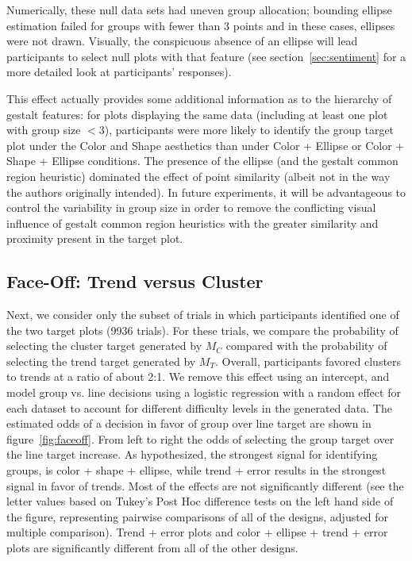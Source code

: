 \documentclass[11pt]{isuthesis}\usepackage[]{graphicx}\usepackage[]{color}
\begin{document}
Numerically, these null data sets had uneven group allocation; bounding ellipse estimation failed for groups with fewer than 3 points and in these cases, ellipses were not drawn. Visually, the conspicuous absence of an ellipse will lead participants to select null plots with that feature (see section~\ref{sec:sentiment} for a more detailed look at participants' responses).

This effect actually provides some additional information as to the hierarchy of gestalt features: for plots displaying the same data (including at least one plot with group size $<3$), participants were more likely to identify the group target plot under the Color and Shape aesthetics than under Color + Ellipse or Color + Shape + Ellipse conditions. 
The presence of the ellipse (and the gestalt common region heuristic) dominated the effect of point similarity (albeit not in the way the authors originally intended). 
In future experiments, it will be advantageous to control the variability in group size in order to remove the conflicting visual influence of gestalt common region heuristics with the greater similarity and proximity present in the target plot. 

\subsection{Face-Off: Trend versus Cluster}
Next, we consider only the subset of trials in which participants identified one of the two target plots (9936 trials). For these trials, we compare the probability of selecting the cluster target generated by $M_C$ compared with the probability of selecting the trend target generated by $M_T$. Overall, participants favored clusters to trends at a ratio of about 2:1. We remove this effect using an intercept, and model group vs. line decisions using a logistic regression with a random effect for each dataset to account for different difficulty levels in the generated data. The estimated odds of a decision in favor of group over line target are shown in figure~\ref{fig:faceoff}. From left to right the odds of selecting the group target  over the line target increase. As hypothesized, the strongest signal for identifying groups, is color + shape + ellipse, while trend + error results in the strongest signal in favor of trends. Most of the effects are not significantly different (see the letter values \cite{piepho:04} based on Tukey's Post Hoc difference tests   on the left hand side of the figure, representing pairwise comparisons of all of the designs, adjusted for multiple comparison). Trend + error plots and color + ellipse + trend + error plots are significantly different from all of the other designs. 
\end{document}

